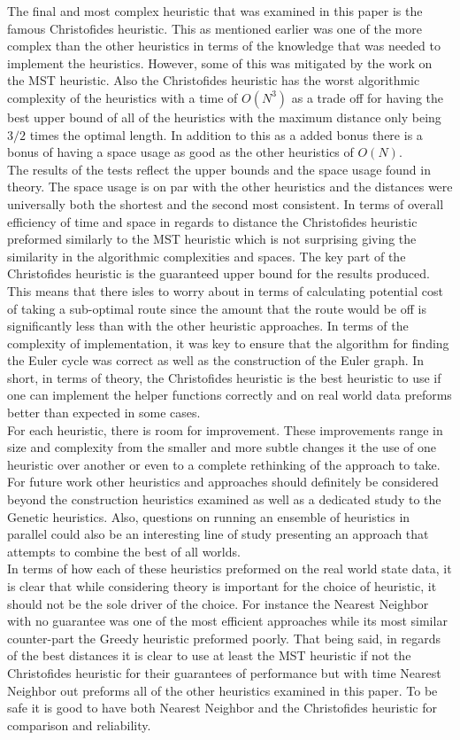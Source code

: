 \documentclass[midd]{thesis}
\newcommand{\tab}{\hspace*{2em}}
\begin{document}
\tab The final and most complex heuristic that was examined in this paper is the famous Christofides heuristic. This as mentioned earlier was one of the more complex than the other heuristics in terms of the knowledge that was needed to implement the heuristics. However, some of this was mitigated by the work on the MST heuristic. Also the Christofides heuristic has the worst algorithmic complexity of the heuristics with a time of $O(N^3)$ as a trade off for having the best upper bound of all of the heuristics with the maximum distance only being $3/2$ times the optimal length. In addition to this as a added bonus there is a bonus of having a space usage as good as the other heuristics of $O(N)$.\\
\tab The results of the tests reflect the upper bounds and the space usage found in theory. The space usage is on par with the other heuristics and the distances were universally both the shortest and the second most consistent. In terms of overall efficiency of time and space in regards to distance the Christofides heuristic preformed similarly to the MST heuristic which is not surprising giving the similarity in the algorithmic complexities and spaces. The key part of the Christofides heuristic is the guaranteed upper bound for the results produced. This means that there isles to worry about in terms of calculating potential cost of taking a sub-optimal route since the amount that the route would be off is significantly less than with the other heuristic approaches. In terms of the complexity of implementation, it was key to ensure that the algorithm for finding the Euler cycle was correct as well as the construction of the Euler graph. In short, in terms of theory, the Christofides heuristic is the best heuristic to use if one can implement the helper functions correctly and on real world data preforms better than expected in some cases.\\
\tab For each heuristic, there is room for improvement. These improvements range in size and complexity from the smaller and more subtle changes it the use of one heuristic over another or even to a complete rethinking of the approach to take. For future work other heuristics and approaches should definitely be considered beyond the construction heuristics examined as well as a dedicated study to the Genetic heuristics. Also, questions on running an ensemble of heuristics in parallel could also be an interesting line of study presenting an approach that attempts to combine the best of all worlds.\\
\tab In terms of how each of these heuristics preformed on the real world state data, it is clear that while considering theory is important for the choice of heuristic, it should not be the sole driver of the choice. For instance the Nearest Neighbor with no guarantee was one of the most efficient approaches while its most similar counter-part the Greedy heuristic preformed poorly. That being said, in regards of the best distances it is clear to use at least the MST heuristic if not the Christofides heuristic for their guarantees of performance but with time Nearest Neighbor out preforms all of the other heuristics examined in this paper. To be safe it is good to have both Nearest Neighbor and the Christofides heuristic for comparison and reliability. 
\end{document}
